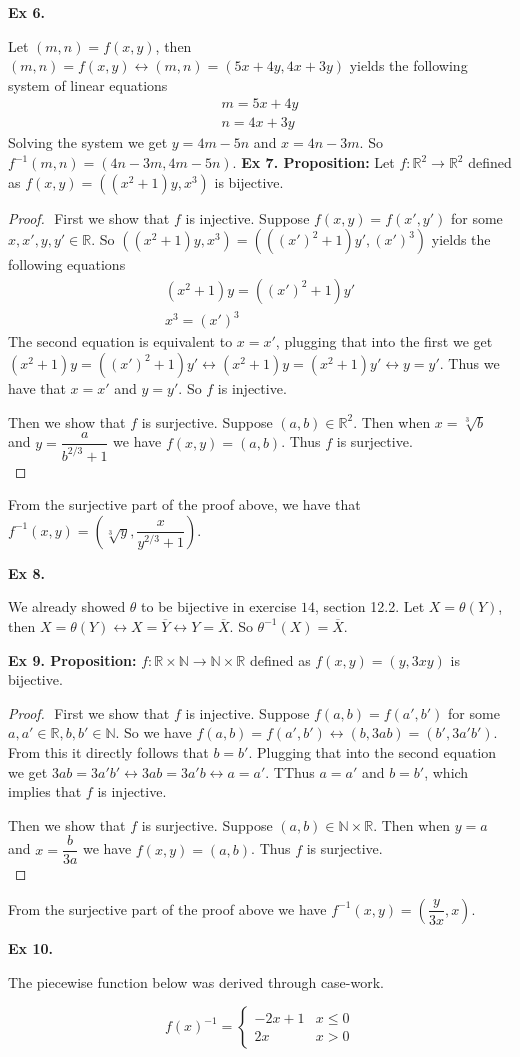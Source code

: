 \documentclass{article}
\begin{document}
\textbf{Ex 6.}

Let $(m, n)=f(x,y)$, then $(m, n) = f(x, y) \leftrightarrow (m, n) = (5x+4y, 4x+3y)$ yields the following system of linear equations
\begin{align*}
m = 5x+4y\\
n = 4x+3y
\end{align*}
Solving the system we get $y=4m-5n$ and $x=4n-3m$. So $f^{-1}(m, n) = (4n-3m, 4m-5n)$.
\newpage
\textbf{Ex 7. Proposition:} Let $f: \mathbb{R}^2 \rightarrow \mathbb{R}^2$ defined as $f(x, y)=((x^2+1)y, x^3)$ is bijective.
\begin{proof}
$ $\newline
First we show that $f$ is injective. Suppose $f(x, y) = f(x', y')$ for some $x, x', y, y' \in \mathbb{R}$. So $((x^2+1)y, x^3)=(((x')^2+1)y', (x')^3)$ yields the following equations
\begin{align*}
(x^2+1)y=((x')^2+1)y'\\
x^3=(x')^3
\end{align*}
The second equation is equivalent to $x=x'$, plugging that into the first we get
$(x^2+1)y=((x')^2+1)y' \leftrightarrow (x^2+1)y=(x^2+1)y' \leftrightarrow y = y'$. Thus we have that $x=x'$ and $y=y'$. So $f$ is injective.

Then we show that $f$ is surjective. Suppose $(a, b) \in \mathbb{R}^2$. Then when $x=\sqrt[3]{b}$ and $y=\dfrac{a}{b^{2/3}+1}$ we have $f(x, y)=(a, b)$. Thus $f$ is surjective.\\
\end{proof}

From the surjective part of the proof above, we have that $f^{-1}(x,y)=(\sqrt[3]{y}, \dfrac{x}{y^{2/3}+1})$.

\textbf{Ex 8.}

We already showed $\theta$ to be bijective in exercise $14$, section 12.2. Let $X = \theta(Y)$, then $X = \theta(Y) \leftrightarrow X = \overline{Y} \leftrightarrow Y = \overline{X}$. So $\theta^{-1}(X)=\overline{X}$.

\textbf{Ex 9. Proposition:} $f: \mathbb{R} \times \mathbb{N} \rightarrow \mathbb{N} \times \mathbb{R}$ defined as $f(x, y) = (y, 3xy)$ is bijective.
\begin{proof}
$ $\newline
First we show that $f$ is injective. Suppose $f(a, b)=f(a', b')$ for some $a, a' \in \mathbb{R}, b, b' \in \mathbb{N}$. So we have $f(a,b)=f(a',b') \leftrightarrow (b, 3ab) = (b', 3a'b')$. From this it directly follows that $b=b'$. Plugging that into the second equation we get $3ab=3a'b' \leftrightarrow 3ab=3a'b \leftrightarrow a = a'$. TThus $a=a'$ and $b=b'$, which implies that $f$ is injective.

Then we show that $f$ is surjective. Suppose $(a, b) \in \mathbb{N} \times \mathbb{R}$. Then when $y=a$ and $x=\dfrac{b}{3a}$ we have $f(x, y)=(a,b)$. Thus $f$ is surjective.\\
\end{proof}

From the surjective part of the proof above we have $f^{-1}(x,y)=(\dfrac{y}{3x}, x)$.

\textbf{Ex 10.}

The piecewise function below was derived through case-work.

    \[ f(x)^{-1} = \begin{cases} 
       -2x+1 &x \leq 0\\
       2x    &x > 0
       
       \end{cases}
    \]
\end{document}
